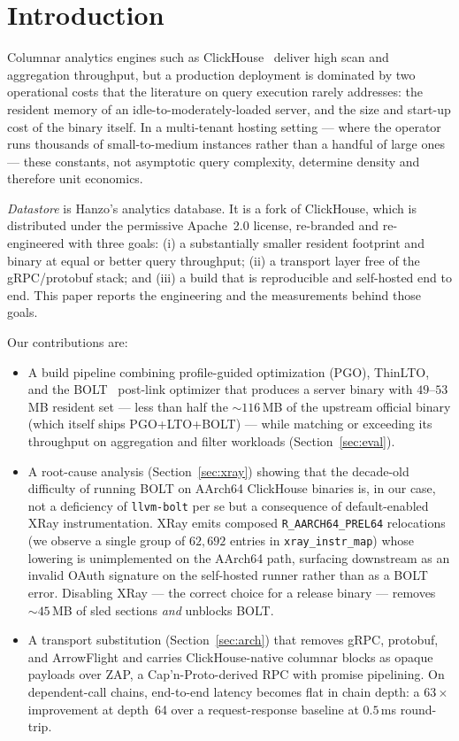 \section{Introduction}

Columnar analytics engines such as ClickHouse~\cite{clickhouse} deliver
high scan and aggregation throughput, but a production deployment is
dominated by two operational costs that the literature on query execution
rarely addresses: the resident memory of an idle-to-moderately-loaded server,
and the size and start-up cost of the binary itself. In a multi-tenant hosting
setting --- where the operator runs thousands of small-to-medium instances
rather than a handful of large ones --- these constants, not asymptotic query
complexity, determine density and therefore unit economics.

\emph{Datastore} is Hanzo's analytics database. It is a fork of ClickHouse,
which is distributed under the permissive Apache~2.0 license, re-branded and
re-engineered with three goals: (i) a substantially smaller resident footprint
and binary at equal or better query throughput; (ii) a transport layer free of
the gRPC/protobuf stack; and (iii) a build that is reproducible and
self-hosted end to end. This paper reports the engineering and the
measurements behind those goals.

Our contributions are:

\begin{itemize}[leftmargin=1.5em]
  \item A build pipeline combining profile-guided optimization (PGO),
  ThinLTO, and the BOLT~\cite{bolt} post-link optimizer that produces a
  server binary with $49$--$53$\,MB resident set --- less than half the
  $\sim\!116$\,MB of the upstream official binary (which itself ships
  PGO+LTO+BOLT) --- while matching or exceeding its throughput on
  aggregation and filter workloads (Section~\ref{sec:eval}).

  \item A root-cause analysis (Section~\ref{sec:xray}) showing that the
  decade-old difficulty of running BOLT on AArch64 ClickHouse binaries is, in
  our case, not a deficiency of \texttt{llvm-bolt} per se but a consequence of
  default-enabled XRay instrumentation. XRay emits composed
  \texttt{R\_AARCH64\_PREL64} relocations (we observe a single group of
  $62{,}692$ entries in \texttt{xray\_instr\_map}) whose lowering is
  unimplemented on the AArch64 path, surfacing downstream as an invalid OAuth
  signature on the self-hosted runner rather than as a BOLT error. Disabling
  XRay --- the correct choice for a release binary --- removes
  $\sim\!45$\,MB of sled sections \emph{and} unblocks BOLT.

  \item A transport substitution (Section~\ref{sec:arch}) that removes gRPC,
  protobuf, and ArrowFlight and carries ClickHouse-native columnar blocks as
  opaque payloads over ZAP, a Cap'n-Proto-derived RPC with promise
  pipelining. On dependent-call chains, end-to-end latency becomes flat in
  chain depth: a $63\times$ improvement at depth~64 over a request-response
  baseline at $0.5$\,ms round-trip.
\end{itemize}

